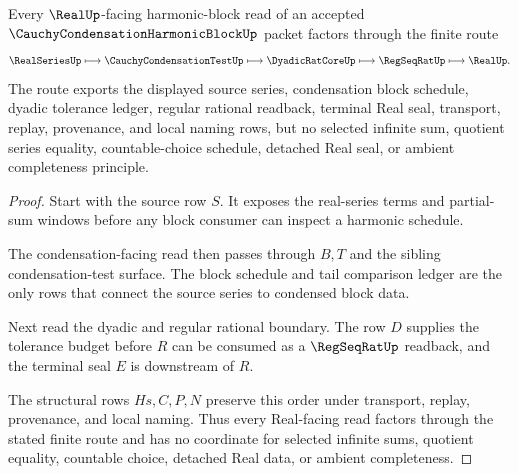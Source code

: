\begin{theorem}
\label{thm:cauchy-condensation-harmonic-block-real-route}
Every $\RealUp$-facing harmonic-block read of an accepted $\CauchyCondensationHarmonicBlockUp$ packet factors through the finite route
$$
\RealSeriesUp \longmapsto \CauchyCondensationTestUp \longmapsto \DyadicRatCoreUp \longmapsto \RegSeqRatUp \longmapsto \RealUp .
$$
The route exports the displayed source series, condensation block schedule, dyadic tolerance ledger, regular rational readback, terminal Real seal, transport, replay, provenance, and local naming rows, but no selected infinite sum, quotient series equality, countable-choice schedule, detached Real seal, or ambient completeness principle.
\end{theorem}
\begin{proof}
Start with the source row $S$. It exposes the real-series terms and partial-sum windows before any block consumer can inspect a harmonic schedule.

The condensation-facing read then passes through $B,T$ and the sibling condensation-test surface. The block schedule and tail comparison ledger are the only rows that connect the source series to condensed block data.

Next read the dyadic and regular rational boundary. The row $D$ supplies the tolerance budget before $R$ can be consumed as a $\RegSeqRatUp$ readback, and the terminal seal $E$ is downstream of $R$.

The structural rows $Hs,C,P,N$ preserve this order under transport, replay, provenance, and local naming. Thus every Real-facing read factors through the stated finite route and has no coordinate for selected infinite sums, quotient equality, countable choice, detached Real data, or ambient completeness.
\end{proof}




